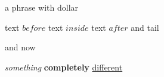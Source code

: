 \documentclass[11pt]{report}
\begin{document}
a phrase with dollar


text $before$ text $inside$ text $after$ and tail
  
and now

\emph{something} \textbf{completely} \underline{different}
\end{document}
